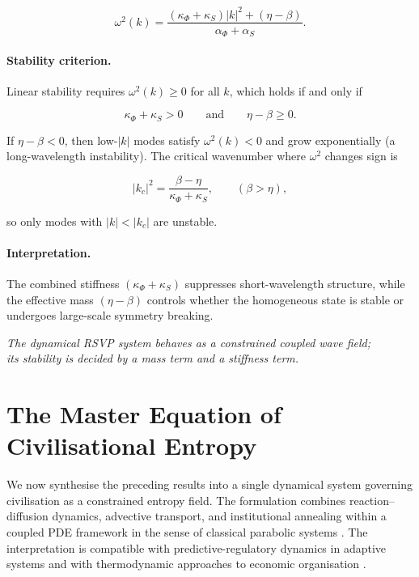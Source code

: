 \documentclass[12pt,a4paper]{article}
\theoremstyle{definition}
\begin{document}
\begin{equation}
  \omega^2(k)
  =
  \frac{(\kappa_\Phi+\kappa_S)|k|^2 + (\eta-\beta)}{\alpha_\Phi+\alpha_S}.
  \label{eq:dispersion}
\end{equation}

\paragraph{Stability criterion.}
Linear stability requires $\omega^2(k)\ge 0$ for all $k$, which holds if and only if

\begin{equation}
  \kappa_\Phi+\kappa_S>0
  \qquad \text{and} \qquad
  \eta-\beta \ge 0.
  \label{eq:dispersion_stability}
\end{equation}

If $\eta-\beta<0$, then low-$|k|$ modes satisfy $\omega^2(k)<0$ and grow
exponentially (a long-wavelength instability).  The critical wavenumber where
$\omega^2$ changes sign is

\begin{equation}
  |k_c|^2 = \frac{\beta-\eta}{\kappa_\Phi+\kappa_S},
  \qquad (\beta>\eta),
\end{equation}

so only modes with $|k|<|k_c|$ are unstable.

\paragraph{Interpretation.}
The combined stiffness $(\kappa_\Phi+\kappa_S)$ suppresses short-wavelength
structure, while the effective mass $(\eta-\beta)$ controls whether the
homogeneous state is stable or undergoes large-scale symmetry breaking.

\medskip
\begin{center}
\itshape
The dynamical RSVP system behaves as a constrained coupled wave field;\\
its stability is decided by a mass term and a stiffness term.
\end{center}

\section{The Master Equation of Civilisational Entropy}
\label{sec:master_equation}

We now synthesise the preceding results into a single dynamical system
governing civilisation as a constrained entropy field.  The formulation
combines reaction–diffusion dynamics, advective transport, and
institutional annealing within a coupled PDE framework in the sense of
classical parabolic systems \citep{evans2010}.  The interpretation is
compatible with predictive-regulatory dynamics in adaptive systems
\citep{friston2023} and with thermodynamic approaches to economic
organisation \citep{georgescu1971,dalziel2018}.
\end{document}
